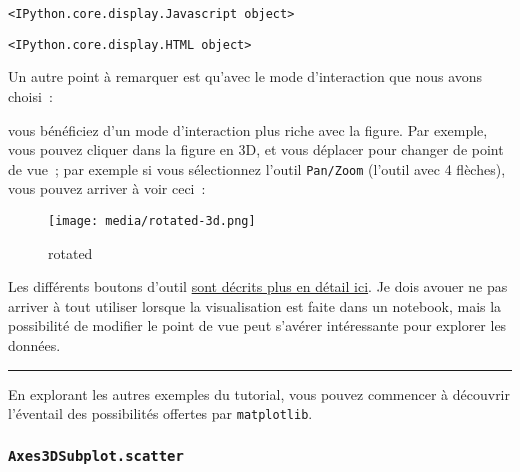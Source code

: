     
    \begin{verbatim}
<IPython.core.display.Javascript object>
    \end{verbatim}

    
    
    \begin{verbatim}
<IPython.core.display.HTML object>
    \end{verbatim}

    
    Un autre point à remarquer est qu'avec le mode d'interaction que nous
avons choisi~:

\begin{Shaded}
\begin{Highlighting}[frame=lines,framerule=0.6mm,rulecolor=\color{asisframecolor}]
\OperatorTok{%}\NormalTok{matplotlib notebook}
\end{Highlighting}
\end{Shaded}

vous bénéficiez d'un mode d'interaction plus riche avec la figure. Par
exemple, vous pouvez cliquer dans la figure en 3D, et vous déplacer pour
changer de point de vue~; par exemple si vous sélectionnez l'outil
\texttt{Pan/Zoom} (l'outil avec 4 flèches), vous pouvez arriver à voir
ceci~:

    \begin{figure}
\centering
\texttt{[image: media/rotated-3d.png]}
\caption{rotated}
\end{figure}

    Les différents boutons d'outil
\href{https://matplotlib.org/users/navigation_toolbar.html}{sont décrits
plus en détail ici}. Je dois avouer ne pas arriver à tout utiliser
lorsque la visualisation est faite dans un notebook, mais la possibilité
de modifier le point de vue peut s'avérer intéressante pour explorer les
données.

    \begin{center}\rule{0.5\linewidth}{\linethickness}\end{center}

    En explorant les autres exemples du tutorial, vous pouvez commencer à
découvrir l'éventail des possibilités offertes par \texttt{matplotlib}.

    \hypertarget{axes3dsubplot.scatter}{%
\subsubsection{\texorpdfstring{\texttt{Axes3DSubplot.scatter}}{Axes3DSubplot.scatter}}\label{axes3dsubplot.scatter}}

